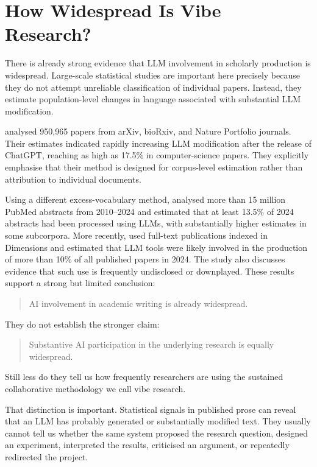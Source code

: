 \documentclass[12pt]{article}
\begin{document}
\section{How Widespread Is Vibe Research?}

There is already strong evidence that LLM involvement in scholarly production is widespread.
Large-scale statistical studies are important here precisely because they do not attempt unreliable classification of individual papers. Instead, they estimate population-level changes in language associated with substantial LLM modification.

\citet{liangEtAl2024mapping} analysed 950,965 papers from arXiv, bioRxiv, and Nature Portfolio journals. Their estimates indicated rapidly increasing LLM modification after the release of ChatGPT, reaching as high as 17.5\% in computer-science papers. They explicitly emphasise that their method is designed for corpus-level estimation rather than attribution to individual documents.

Using a different excess-vocabulary method, \citet{kobakEtAl2024biomedical} analysed more than 15 million PubMed abstracts from 2010--2024 and estimated that at least 13.5\% of 2024 abstracts had been processed using LLMs, with substantially higher estimates in some subcorpora.
More recently, \citet{gray2025prevalence} used full-text publications indexed in Dimensions and estimated that LLM tools were likely involved in the production of more than 10\% of all published papers in 2024. The study also discusses evidence that such use is frequently undisclosed or downplayed. These results support a strong but limited conclusion:
\begin{quote}
AI involvement in academic writing is already widespread.
\end{quote}
They do not establish the stronger claim:
\begin{quote}
Substantive AI participation in the underlying research is equally widespread.
\end{quote}
Still less do they tell us how frequently researchers are using the sustained collaborative methodology we call vibe research.

That distinction is important. Statistical signals in published prose can reveal that an LLM has probably generated or substantially modified text. They usually cannot tell us whether the same system proposed the research question, designed an experiment, interpreted the results, criticised an argument, or repeatedly redirected the project.
\end{document}
